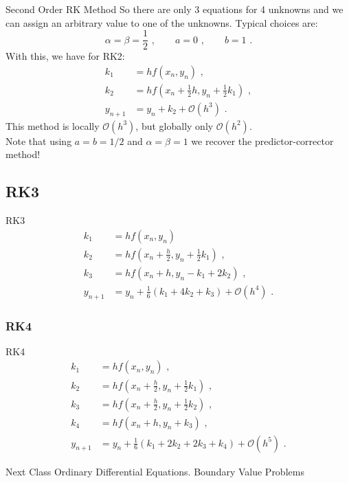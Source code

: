 \documentclass[11pt]{beamer}
\begin{document}
\begin{frame}[fragile]{Second Order RK Method}
So there are only 3 equations for 4 unknowns and we can assign an arbitrary
value to one of the unknowns. Typical choices are:
\begin{equation}
\alpha = \beta = \frac{1}{2}\,\,,\hspace{2em} a=0\,\,, \hspace{2em} b = 1\,\,.
\end{equation}
With this, we have for RK2:
\begin{align}
k_1 & = h f(x_n,y_n)\,\,,\\
k_2 & = h f(x_n + \frac{1}{2}h, y_n + \frac{1}{2}k_1)\,\,,\\
y_{n+1} & = y_n + k_2 + \mathcal{O}(h^3)\,\,.
\end{align}
This method is locally $\mathcal{O}(h^3)$, but globally
only $\mathcal{O}(h^2)$. \\
\tiny 
Note that using 
$a=b=1/2$ and $\alpha=\beta=1$ we recover the predictor-corrector method!
\end{frame}



\subsection{RK3}
\begin{frame}[fragile]{RK3}
\begin{align}
k_1 &=h f(x_n,y_n)\,\,\nonumber\\
k_2 &= h f(x_n + \frac{h}{2},y_n + \frac{1}{2} k_1)\,\,,\nonumber\\
k_3 &= h f(x_n + h, y_n - k_1 + 2 k_2)\,\,,\nonumber\\
y_{n+1} &= y_n + \frac{1}{6}(k_1 + 4 k_2 + k_3) + \mathcal{O}(h^4)\,\,.
\end{align}
\end{frame}

\subsubsection{RK4}
\begin{frame}[fragile]{RK4}
\begin{align}
k_1 &=h f(x_n,y_n)\,\,,\\
k_2 &=h f(x_n + \frac{h}{2},y_n + \frac{1}{2}k_1)\,\,,\nonumber\\
k_3 &=h f(x_n + \frac{h}{2},y_n + \frac{1}{2}k_2)\,\,,\nonumber\\
k_4 &=h f(x_n+h,y_n + k_3)\,\,,\nonumber\\
y_{n+1} &= y_n + \frac{1}{6}(k_1 + 2 k_2 + 2 k_3 + k_4) + \mathcal{O}(h^5)\,\,.
\end{align}
\end{frame}



\begin{frame}[fragile]{Next Class}
Ordinary Differential Equations. Boundary Value Problems
\end{frame}
\end{document}
